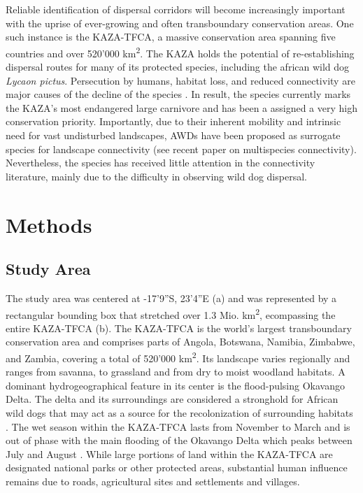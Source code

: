 \documentclass[abstract=on,10pt,a4paper,bibliography=totocnumbered]{article}
\begin{document}
Reliable identification of dispersal corridors will become increasingly
important with the uprise of ever-growing and often transboundary conservation
areas. One such instance is the KAZA-TFCA, a massive conservation area spanning
five countries and over 520'000 km\textsuperscript{2}. The KAZA holds the
potential of re-establishing dispersal routes for many of its protected species,
including the african wild dog \textit{Lycaon pictus}.  Persecution by humans,
habitat loss, and reduced connectivity are major causes of the decline of the
species \citep{Woodroffe.2012}. In result, the species currently marks the
KAZA's most endangered large carnivore and has been a assigned a very high
conservation priority. Importantly, due to their inherent mobility and intrinsic
need for vast undisturbed landscapes, AWDs have been proposed as surrogate
species for landscape connectivity (see recent paper on multispecies
connectivity). Nevertheless, the species has received little attention in the
connectivity literature, mainly due to the difficulty in observing wild dog
dispersal.

\section{Methods}
\subsection{Study Area}
The study area was centered at -17'9''S, 23'4''E
(a) and was represented by a rectangular bounding box that
stretched over 1.3 Mio. km\textsuperscript{2}, ecompassing the entire KAZA-TFCA
(b). The KAZA-TFCA is the world's largest transboundary
conservation area and comprises parts of Angola, Botswana, Namibia, Zimbabwe,
and Zambia, covering a total of 520'000 km\textsuperscript{2}. Its landscape
varies regionally and ranges from savanna, to grassland and from dry to moist
woodland habitats. A dominant hydrogeographical feature in its center is the
flood-pulsing Okavango Delta. The delta and its surroundings are considered a
stronghold for African wild dogs that may act as a source for the recolonization
of surrounding habitats \citep{Cozzi.2013}. The wet season within the KAZA-TFCA
lasts from November to March and is out of phase with the main flooding of the
Okavango Delta which peaks between July and August \citep{McNutt.1996,
Wolski.2017}. While large portions of land within the KAZA-TFCA are designated
national parks or other protected areas, substantial human influence remains due
to roads, agricultural sites and settlements and villages.
\end{document}
